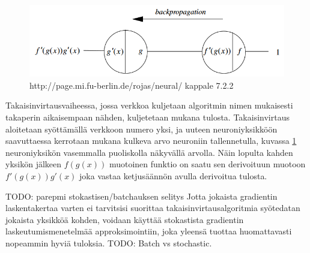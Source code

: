 \documentclass[finnish]{tktltiki2}
\theoremstyle{definition}
\theoremstyle{remark}
\begin{document}
  \begin{figure}[h]
    \label{pic:backpropagation}
    \centering
    \includegraphics[scale=0.5]{backpropagation}
    \caption{http://page.mi.fu-berlin.de/rojas/neural/ kappale 7.2.2}
  \end{figure}

  Takaisinvirtausvaiheessa, jossa verkkoa kuljetaan algoritmin nimen mukaisesti takaperin aikaisempaan nähden, kuljetetaan mukana tulosta. Takaisinvirtaus aloitetaan syöttämällä verkkoon numero yksi, ja uuteen neuroniyksikköön saavuttaessa kerrotaan mukana kulkeva arvo neuroniin tallennetulla, kuvassa \ref{pic:backpropagation} neuroniyksikön vasemmalla puoliskolla näkyvällä arvolla. Näin lopulta kahden yksikön jälkeen $f(g(x))$ muotoinen funktio on saatu sen derivoituun muotoon $f'(g(x))g'(x)$ joka vastaa ketjusäännön avulla derivoitua tulosta.




  
  TODO: parepmi stokastisen/batchauksen selitys
  Jotta jokaista gradientin laskentakertaa varten ei tarvitsisi suorittaa takaisinvirtausalgoritmia syötedatan jokaista yksikköä kohden, voidaan käyttää stokastista gradientin laskeutumismenetelmää approksimointiin, joka yleensä tuottaa huomattavasti nopeammin hyviä tuloksia. TODO: Batch vs stochastic.


\end{document}
